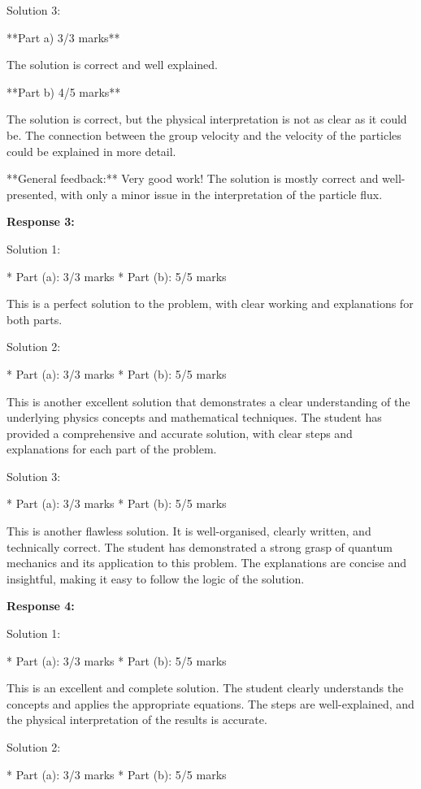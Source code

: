 \documentclass[a4paper,11pt]{article}
\begin{document}
Solution 3:

**Part a) 3/3 marks**

The solution is correct and well explained.

**Part b) 4/5 marks**

The solution is correct, but the physical interpretation is not as clear as it could be. The connection between the group velocity and the velocity of the particles could be explained in more detail.

**General feedback:** Very good work! The solution is mostly correct and well-presented, with only a minor issue in the interpretation of the particle flux.

\bigskip    
\textbf{Response 3:}

Solution 1:

*   Part (a): 3/3 marks
*   Part (b): 5/5 marks

This is a perfect solution to the problem, with clear working and explanations for both parts.

Solution 2:

*   Part (a): 3/3 marks
*   Part (b): 5/5 marks

This is another excellent solution that demonstrates a clear understanding of the underlying physics concepts and mathematical techniques. The student has provided a comprehensive and accurate solution, with clear steps and explanations for each part of the problem.

Solution 3:

*   Part (a): 3/3 marks
*   Part (b): 5/5 marks

This is another flawless solution. It is well-organised, clearly written, and technically correct. The student has demonstrated a strong grasp of quantum mechanics and its application to this problem. The explanations are concise and insightful, making it easy to follow the logic of the solution.

\bigskip    
\textbf{Response 4:}

Solution 1:

*   Part (a): 3/3 marks
*   Part (b): 5/5 marks

This is an excellent and complete solution. The student clearly understands the concepts and applies the appropriate equations. The steps are well-explained, and the physical interpretation of the results is accurate.

Solution 2:

*   Part (a): 3/3 marks
*   Part (b): 5/5 marks
\end{document}
